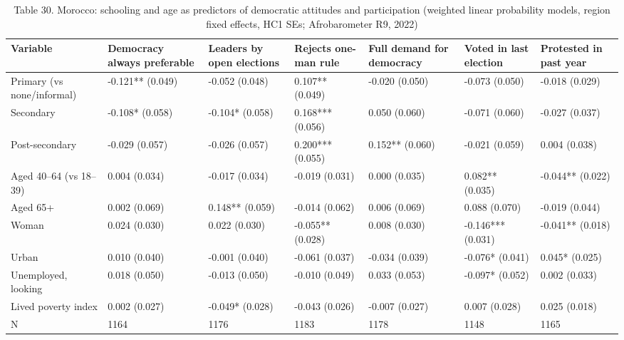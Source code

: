 \begin{table}
\caption{Table 30. Morocco: schooling and age as predictors of democratic attitudes and participation (weighted linear probability models, region fixed effects, HC1 SEs; Afrobarometer R9, 2022)}
\label{tab:T30_morocco_regressions}
\begin{tabular}{lllllll}
\toprule
Variable & Democracy always preferable & Leaders by open elections & Rejects one-man rule & Full demand for democracy & Voted in last election & Protested in past year \\
\midrule
Primary (vs none/informal) & -0.121** (0.049) & -0.052 (0.048) & 0.107** (0.049) & -0.020 (0.050) & -0.073 (0.050) & -0.018 (0.029) \\
Secondary & -0.108* (0.058) & -0.104* (0.058) & 0.168*** (0.056) & 0.050 (0.060) & -0.071 (0.060) & -0.027 (0.037) \\
Post-secondary & -0.029 (0.057) & -0.026 (0.057) & 0.200*** (0.055) & 0.152** (0.060) & -0.021 (0.059) & 0.004 (0.038) \\
Aged 40–64 (vs 18–39) & 0.004 (0.034) & -0.017 (0.034) & -0.019 (0.031) & 0.000 (0.035) & 0.082** (0.035) & -0.044** (0.022) \\
Aged 65+ & 0.002 (0.069) & 0.148** (0.059) & -0.014 (0.062) & 0.006 (0.069) & 0.088 (0.070) & -0.019 (0.044) \\
Woman & 0.024 (0.030) & 0.022 (0.030) & -0.055** (0.028) & 0.008 (0.030) & -0.146*** (0.031) & -0.041** (0.018) \\
Urban & 0.010 (0.040) & -0.001 (0.040) & -0.061 (0.037) & -0.034 (0.039) & -0.076* (0.041) & 0.045* (0.025) \\
Unemployed, looking & 0.018 (0.050) & -0.013 (0.050) & -0.010 (0.049) & 0.033 (0.053) & -0.097* (0.052) & 0.002 (0.033) \\
Lived poverty index & 0.002 (0.027) & -0.049* (0.028) & -0.043 (0.026) & -0.007 (0.027) & 0.007 (0.028) & 0.025 (0.018) \\
N & 1164 & 1176 & 1183 & 1178 & 1148 & 1165 \\
\bottomrule
\end{tabular}
\end{table}
